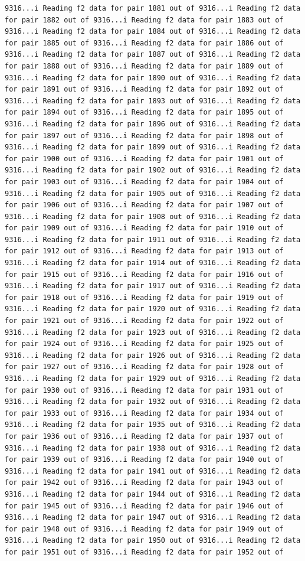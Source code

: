 \documentclass[
]{article}
\begin{document}
\begin{verbatim}
9316...i Reading f2 data for pair 1881 out of 9316...i Reading f2 data for pair 1882 out of 9316...i Reading f2 data for pair 1883 out of 9316...i Reading f2 data for pair 1884 out of 9316...i Reading f2 data for pair 1885 out of 9316...i Reading f2 data for pair 1886 out of 9316...i Reading f2 data for pair 1887 out of 9316...i Reading f2 data for pair 1888 out of 9316...i Reading f2 data for pair 1889 out of 9316...i Reading f2 data for pair 1890 out of 9316...i Reading f2 data for pair 1891 out of 9316...i Reading f2 data for pair 1892 out of 9316...i Reading f2 data for pair 1893 out of 9316...i Reading f2 data for pair 1894 out of 9316...i Reading f2 data for pair 1895 out of 9316...i Reading f2 data for pair 1896 out of 9316...i Reading f2 data for pair 1897 out of 9316...i Reading f2 data for pair 1898 out of 9316...i Reading f2 data for pair 1899 out of 9316...i Reading f2 data for pair 1900 out of 9316...i Reading f2 data for pair 1901 out of 9316...i Reading f2 data for pair 1902 out of 9316...i Reading f2 data for pair 1903 out of 9316...i Reading f2 data for pair 1904 out of 9316...i Reading f2 data for pair 1905 out of 9316...i Reading f2 data for pair 1906 out of 9316...i Reading f2 data for pair 1907 out of 9316...i Reading f2 data for pair 1908 out of 9316...i Reading f2 data for pair 1909 out of 9316...i Reading f2 data for pair 1910 out of 9316...i Reading f2 data for pair 1911 out of 9316...i Reading f2 data for pair 1912 out of 9316...i Reading f2 data for pair 1913 out of 9316...i Reading f2 data for pair 1914 out of 9316...i Reading f2 data for pair 1915 out of 9316...i Reading f2 data for pair 1916 out of 9316...i Reading f2 data for pair 1917 out of 9316...i Reading f2 data for pair 1918 out of 9316...i Reading f2 data for pair 1919 out of 9316...i Reading f2 data for pair 1920 out of 9316...i Reading f2 data for pair 1921 out of 9316...i Reading f2 data for pair 1922 out of 9316...i Reading f2 data for pair 1923 out of 9316...i Reading f2 data for pair 1924 out of 9316...i Reading f2 data for pair 1925 out of 9316...i Reading f2 data for pair 1926 out of 9316...i Reading f2 data for pair 1927 out of 9316...i Reading f2 data for pair 1928 out of 9316...i Reading f2 data for pair 1929 out of 9316...i Reading f2 data for pair 1930 out of 9316...i Reading f2 data for pair 1931 out of 9316...i Reading f2 data for pair 1932 out of 9316...i Reading f2 data for pair 1933 out of 9316...i Reading f2 data for pair 1934 out of 9316...i Reading f2 data for pair 1935 out of 9316...i Reading f2 data for pair 1936 out of 9316...i Reading f2 data for pair 1937 out of 9316...i Reading f2 data for pair 1938 out of 9316...i Reading f2 data for pair 1939 out of 9316...i Reading f2 data for pair 1940 out of 9316...i Reading f2 data for pair 1941 out of 9316...i Reading f2 data for pair 1942 out of 9316...i Reading f2 data for pair 1943 out of 9316...i Reading f2 data for pair 1944 out of 9316...i Reading f2 data for pair 1945 out of 9316...i Reading f2 data for pair 1946 out of 9316...i Reading f2 data for pair 1947 out of 9316...i Reading f2 data for pair 1948 out of 9316...i Reading f2 data for pair 1949 out of 9316...i Reading f2 data for pair 1950 out of 9316...i Reading f2 data for pair 1951 out of 9316...i Reading f2 data for pair 1952 out of 
\end{verbatim}
\end{document}
